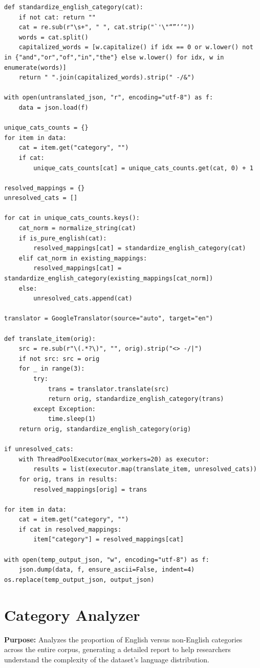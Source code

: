 \documentclass[11pt]{article}
\begin{document}
\begin{lstlisting}[style=pythoncode, caption={advanced\_translator.py}]
def standardize_english_category(cat):
    if not cat: return ""
    cat = re.sub(r"\s+", " ", cat.strip("`'\"“”‘’"))
    words = cat.split()
    capitalized_words = [w.capitalize() if idx == 0 or w.lower() not in {"and","or","of","in","the"} else w.lower() for idx, w in enumerate(words)]
    return " ".join(capitalized_words).strip(" -/&")

with open(untranslated_json, "r", encoding="utf-8") as f:
    data = json.load(f)

unique_cats_counts = {}
for item in data:
    cat = item.get("category", "")
    if cat:
        unique_cats_counts[cat] = unique_cats_counts.get(cat, 0) + 1

resolved_mappings = {}
unresolved_cats = []

for cat in unique_cats_counts.keys():
    cat_norm = normalize_string(cat)
    if is_pure_english(cat):
        resolved_mappings[cat] = standardize_english_category(cat)
    elif cat_norm in existing_mappings:
        resolved_mappings[cat] = standardize_english_category(existing_mappings[cat_norm])
    else:
        unresolved_cats.append(cat)

translator = GoogleTranslator(source="auto", target="en")

def translate_item(orig):
    src = re.sub(r"\(.*?\)", "", orig).strip("<> -/|")
    if not src: src = orig
    for _ in range(3):
        try:
            trans = translator.translate(src)
            return orig, standardize_english_category(trans)
        except Exception:
            time.sleep(1)
    return orig, standardize_english_category(orig)

if unresolved_cats:
    with ThreadPoolExecutor(max_workers=20) as executor:
        results = list(executor.map(translate_item, unresolved_cats))
    for orig, trans in results:
        resolved_mappings[orig] = trans

for item in data:
    cat = item.get("category", "")
    if cat in resolved_mappings:
        item["category"] = resolved_mappings[cat]

with open(temp_output_json, "w", encoding="utf-8") as f:
    json.dump(data, f, ensure_ascii=False, indent=4)
os.replace(temp_output_json, output_json)
\end{lstlisting}


\section{Category Analyzer} \label{sec:analyzer}
\textbf{Purpose:} Analyzes the proportion of English versus non-English categories across the entire corpus, generating a detailed report to help researchers understand the complexity of the dataset's language distribution.
\end{document}
